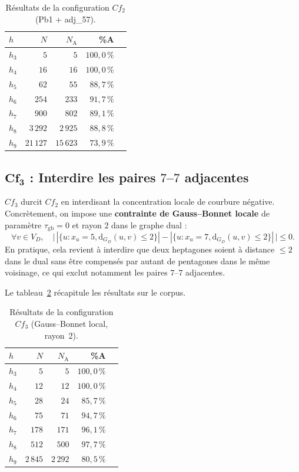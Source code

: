\documentclass[11pt,a4paper]{article}
\newcommand{\GD}{\ensuremath{G_D}}                 %
\begin{document}
\begin{table}[h]
\centering
\small
\begin{tabular}{lrrrr}
\toprule
$h$ & $N$ & $N_{\text{A}}$ & \%A \\
\midrule
$h_3$ & $5$       & $5$       & $100{,}0\,\%$ \\
$h_4$ & $16$      & $16$      & $100{,}0\,\%$ \\
$h_5$ & $62$      & $55$      & $88{,}7\,\%$  \\
$h_6$ & $254$     & $233$     & $91{,}7\,\%$  \\
$h_7$ & $900$     & $802$     & $89{,}1\,\%$  \\
$h_8$ & $3\,292$  & $2\,925$  & $88{,}8\,\%$  \\
$h_9$ & $21\,127$ & $15\,623$ & $73{,}9\,\%$  \\
\bottomrule
\end{tabular}
\caption{Résultats de la configuration $Cf_2$ (Pb1 + adj\_57).}
\label{tab:res-c2}
\end{table}

\subsection{$\mathbf{Cf_3}$ : Interdire les paires $7$--$7$ adjacentes}

$Cf_3$ durcit $Cf_2$ en interdisant la concentration locale de courbure
négative. Concrètement, on impose une \textbf{contrainte de Gauss--Bonnet
locale} de paramètre $\tau_{\text{gb}} = 0$ et rayon $2$ dans le graphe dual :
\[
  \forall v \in V_D,\quad
  \bigl|\,|\{u : x_u = 5, \mathrm{d}_{\GD}(u,v) \le 2\}|
       - |\{u : x_u = 7, \mathrm{d}_{\GD}(u,v) \le 2\}|\,\bigr| \le 0 .
\]
En pratique, cela revient à interdire que deux heptagones soient à distance
$\le 2$ dans le dual sans être compensés par autant de pentagones dans le
même voisinage, ce qui exclut notamment les paires $7$--$7$ adjacentes.

Le tableau~\ref{tab:res-c3} récapitule les résultats sur le corpus.

\begin{table}[h]
\centering
\small
\begin{tabular}{lrrrr}
\toprule
$h$ & $N$ & $N_{\text{A}}$ & \%A \\
\midrule
$h_3$ & $5$      & $5$      & $100{,}0\,\%$ \\
$h_4$ & $12$     & $12$     & $100{,}0\,\%$ \\
$h_5$ & $28$     & $24$     & $85{,}7\,\%$  \\
$h_6$ & $75$     & $71$     & $94{,}7\,\%$  \\
$h_7$ & $178$    & $171$    & $96{,}1\,\%$  \\
$h_8$ & $512$    & $500$    & $97{,}7\,\%$  \\
$h_9$ & $2\,845$ & $2\,292$ & $80{,}5\,\%$  \\
\bottomrule
\end{tabular}
\caption{Résultats de la configuration $Cf_3$ (Gauss--Bonnet local, rayon~2).}
\label{tab:res-c3}
\end{table}
\end{document}
